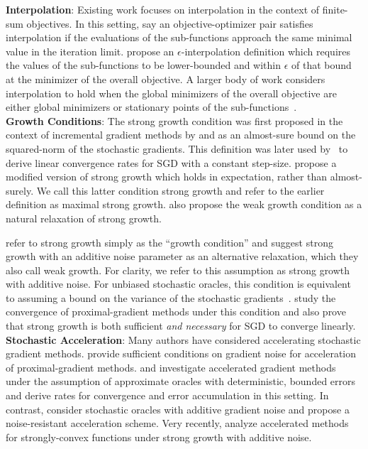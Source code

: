 \noindent \textbf{Interpolation}:
Existing work focuses on interpolation in the context of finite-sum objectives. 
In this setting, \citet{bassily2018exponential} say an objective-optimizer pair satisfies interpolation if the evaluations of the sub-functions approach the same minimal value in the iteration limit. 
\citet{berrada2019training} propose an \( \epsilon \)-interpolation definition which requires the values of the sub-functions to be lower-bounded and within \( \epsilon  \) of that bound at the minimizer of the overall objective. 
A larger body of work considers interpolation to hold when the global minimizers of the overall objective are either global minimizers or stationary points of the sub-functions~\cite{vaswani2019fast, vaswani2019painless, vaswani2020adaptive, meng2020fastandfurious, loizou2020sps}.\\

\noindent \textbf{Growth Conditions}:
The strong growth condition was first proposed in the context of incremental gradient methods by \citet{solodov1998incremental} and \citet{tseng1998incremental} as an almost-sure bound on the squared-norm of the stochastic gradients. 
This definition was later used by~\citet{schmidt2013fast} to derive linear convergence rates for \ac{SGD} with a constant step-size. 
\citet{vaswani2019fast} propose a modified version of strong growth which holds in expectation, rather than almost-surely. 
We call this latter condition strong growth and refer to the earlier definition as maximal strong growth.
\citet{vaswani2019fast} also propose the weak growth condition as a natural relaxation of strong growth. 

\citet{cevher2018linear} refer to strong growth simply as the ``growth condition'' and suggest strong growth with an additive noise parameter as an alternative relaxation, which they also call weak growth.
For clarity, we refer to this assumption as strong growth with additive noise.
For unbiased stochastic oracles, this condition is equivalent to assuming a bound on the variance of the stochastic gradients~\citep{khaled2020better, ghadimi2012optimal1}.
\citet{cevher2018linear} study the convergence of proximal-gradient methods under this condition and also prove that strong growth is both sufficient \emph{and necessary} for \ac{SGD} to converge linearly.\\


\noindent \textbf{Stochastic Acceleration}: 
Many authors have considered accelerating stochastic gradient methods.
\citet{schmidt2011convergence} provide sufficient conditions on gradient noise for acceleration of proximal-gradient methods.
\citet{aspremont2008approximate} and \citet{devolder2014first} investigate accelerated gradient methods under the assumption of approximate oracles with deterministic, bounded errors and derive rates for convergence and error accumulation in this setting.
In contrast, \citet{cohen2018acceleration} consider stochastic oracles with additive gradient noise and propose a noise-resistant acceleration scheme.
Very recently, \citet{chen2020understanding} analyze accelerated methods for strongly-convex functions under strong growth with additive noise. 

